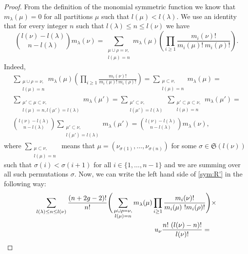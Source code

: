 \documentclass[12pt]{amsart}
\theoremstyle{plain}
\theoremstyle{remark}
\newcommand{\Sym}{\mathfrak{S}}
\begin{document}
\begin{proof}
From the definition of the monomial symmetric function we know that
$m_{\lambda}(\mu) = 0$ for all partitions $\mu$ such that $l(\mu) < l(\lambda)$.
We use an identity that for every integer $n$ such that $l(\lambda)
\leq n \leq l(\nu)$ we have
\begin{equation}
\label{sym:mon}
\binom{l(\nu) - l(\lambda)}{n - l(\lambda)} m_{\lambda}(\nu) = 
\sum_{\substack{\mu \cup
\rho = \nu, \\ l(\mu) = n}} m_{\lambda}(\mu)
\left( \prod_{i \geq 1} \frac{m_i(\nu)!}{m_i(\mu)!\ m_i(\rho)!}\right).
\end{equation}
Indeed, 
\begin{multline*}
\sum_{\substack{\mu \cup
\rho = \nu, \\ l(\mu) = n}} m_{\lambda}(\mu)
\left( \prod_{i \geq 1} \frac{m_i(\nu)!}{m_i(\mu)!\ m_i(\rho)!}\right) =
\sum_{\substack{\mu \subset \nu, \\ l(\mu) = n}} m_{\lambda}(\mu) = \\
\sum_{\substack{\mu' \subset \mu \subset \nu, \\ l(\mu) = n, l(\mu') = 
l(\lambda)}} m_{\lambda}(\mu') = 
\sum_{\substack{\mu' \subset \nu, \\ l(\mu') = l(\lambda)}} \sum_{\substack{\mu'
\subset \mu \subset \nu, \\ l(\mu) = n}} m_{\lambda}(\mu') = \\
\binom{l(\nu) -
l(\lambda)}{n - l(\lambda)} \sum_{\substack{\mu' \subset \nu, \\ l(\mu') =
l(\lambda)}} m_{\lambda}(\mu') = \binom{l(\nu) - l(\lambda)}{n - l(\lambda)}
m_{\lambda}(\nu),
\end{multline*}
where  $\sum_{\substack{\mu \subset \nu, \\ l(\mu) = n}}$ means that $\mu =
(\nu_{\sigma(1)}, \dots, \nu_{\sigma(n)})$ for some $\sigma \in \Sym(l(\nu))$
such that $\sigma(i) < \sigma(i+1)$ for all $i \in
\{1,\dots,n-1\}$ and we are summing over all such permutations $\sigma$.
Now, we can write the left hand side of \eqref{sym:R'} in the
following way:
\begin{multline*}
 \sum_{l(\lambda) \leq n \leq l(\nu)} \frac{(n + 2g -2)!}{n!}
\Bigg( \sum_{\substack{\mu \cup
\rho = \nu,\\ l(\mu) = n}} m_{\lambda}(\mu) \prod_{i \geq 1}
\frac{m_i(\nu)!}{m_i(\mu)\
!m_i(\rho)!}\Bigg) \times \\ \shoveright{u_{\nu} \frac{n!\ (l(\nu) -
n)!}{l(\nu)!} =} 

\end{multline*}
\end{proof}
\end{document}
